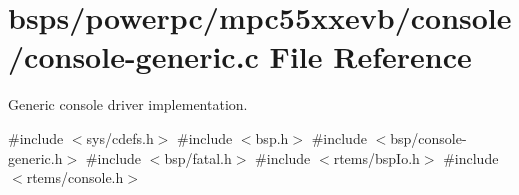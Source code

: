 \hypertarget{mpc55xxevb_2console_2console-generic_8c}{}\section{bsps/powerpc/mpc55xxevb/console/console-\/generic.c File Reference}
\label{mpc55xxevb_2console_2console-generic_8c}


Generic console driver implementation.  


{\ttfamily \#include $<$sys/cdefs.\+h$>$}\newline
{\ttfamily \#include $<$bsp.\+h$>$}\newline
{\ttfamily \#include $<$bsp/console-\/generic.\+h$>$}\newline
{\ttfamily \#include $<$bsp/fatal.\+h$>$}\newline
{\ttfamily \#include $<$rtems/bsp\+Io.\+h$>$}\newline
{\ttfamily \#include $<$rtems/console.\+h$>$}\newline

